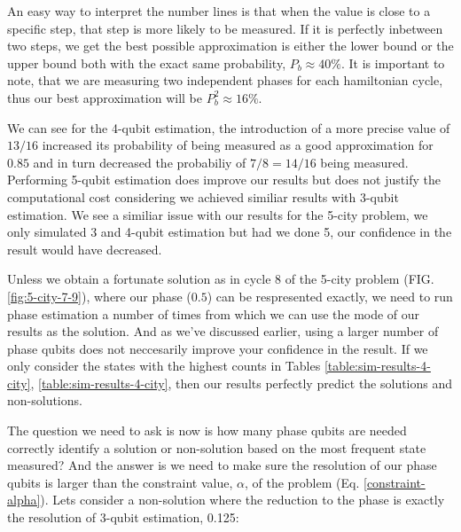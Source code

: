 \documentclass[msc,oneside]{ubcthesis}
\begin{document}
	An easy way to interpret the number lines is that when the value is close to a specific step, that step is more likely to be measured. If it is perfectly inbetween two steps, we get the best possible approximation is either the lower bound or the upper bound both with the exact same probability, $P_b \approx 40\%$. It is important to note, that we are measuring two independent phases for each hamiltonian cycle, thus our best approximation will be $P_b^2 \approx 16\%$. 
	
	We can see for the 4-qubit estimation, the introduction of a more precise value of $13/16$ increased its probability of being measured as a good approximation for $0.85$ and in turn decreased the probabiliy of $7/8  = 14/16$ being measured. Performing 5-qubit estimation does improve our results but does not justify the computational cost considering we achieved similiar results with 3-qubit estimation. We see a similiar issue with our results for the 5-city problem, we only simulated 3 and 4-qubit estimation but had we done 5, our confidence in the result would have decreased.
	
	Unless we obtain a fortunate solution as in cycle 8 of the 5-city problem (FIG. \ref{fig:5-city-7-9}), where our phase ($0.5$) can be respresented exactly, we need to run phase estimation a number of times from which we can use the mode of our results as the solution. And as we've discussed earlier, using a larger number of phase qubits does not neccesarily improve your confidence in the result. If we only consider the states with the highest counts in Tables \ref{table:sim-results-4-city},  \ref{table:sim-results-4-city}, then our results perfectly predict the solutions and non-solutions.
	
	The question we need to ask is now is how many phase qubits are needed correctly identify a solution or non-solution based on the most frequent state measured? And the answer is we need to make sure the resolution of our phase qubits is larger than the constraint value, $\alpha$, of the problem (Eq. \ref{constraint-alpha}). Lets consider a non-solution where the reduction to the phase is exactly the resolution of 3-qubit estimation, 0.125:
	
	
	
\end{document}
